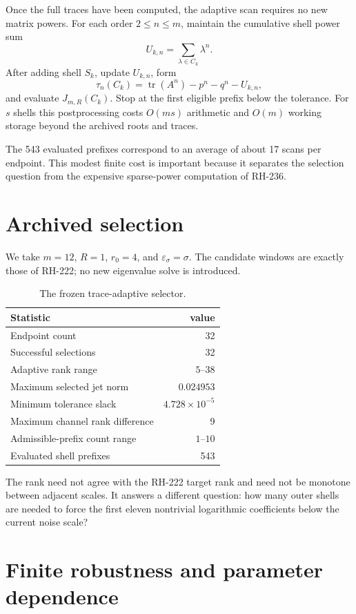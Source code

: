 \documentclass[11pt]{article}
\theoremstyle{remark}
\begin{document}
Once the full traces have been computed, the adaptive scan requires no new
matrix powers.  For each order $2\le n\le m$, maintain the cumulative shell
power sum
\[
 U_{k,n}=\sum_{\lambda\in C_k}\lambda^n.
\]
After adding shell $S_k$, update $U_{k,n}$, form
\[
 \tau_n(C_k)=\operatorname{tr}(A^n)-p^n-q^n-U_{k,n},
\]
and evaluate $J_{m,R}(C_k)$.  Stop at the first eligible prefix below the
tolerance.  For $s$ shells this postprocessing costs $O(ms)$ arithmetic and
$O(m)$ working storage beyond the archived roots and traces.

The 543 evaluated prefixes correspond to an average of about 17 scans per
endpoint.  This modest finite cost is important because it separates the
selection question from the expensive sparse-power computation of RH-236.

\section{Archived selection}

We take $m=12$, $R=1$, $r_0=4$, and $\varepsilon_\sigma=\sigma$.  The
candidate windows are exactly those of RH-222; no new eigenvalue solve is
introduced.

\begin{table}[ht]
\centering
\small
\begin{tabular}{lr}
\toprule
Statistic & value\\
\midrule
Endpoint count & 32\\
Successful selections & 32\\
Adaptive rank range & $5$--$38$\\
Maximum selected jet norm & $0.024953$\\
Minimum tolerance slack & $4.728\times10^{-5}$\\
Maximum channel rank difference & 9\\
Admissible-prefix count range & $1$--$10$\\
Evaluated shell prefixes & 543\\
\bottomrule
\end{tabular}
\caption{The frozen trace-adaptive selector.}
\end{table}

The rank need not agree with the RH-222 target rank and need not be monotone
between adjacent scales.  It answers a different question: how many outer
shells are needed to force the first eleven nontrivial logarithmic
coefficients below the current noise scale?

\section{Finite robustness and parameter dependence}
\end{document}
